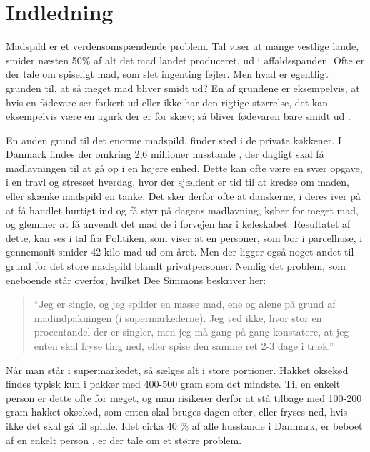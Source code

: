 \section{Indledning}
\label{sec:indledning}

Madspild er et verdensomspændende problem. Tal viser at mange vestlige lande, smider næsten 50\% af alt det mad landet produceret, ud i affaldsspanden. Ofte er der tale om spiseligt mad, som slet ingenting fejler. Men hvad er egentligt grunden til, at så meget mad bliver smidt ud? En af grundene er eksempelvis, at hvis en fødevare ser forkert ud eller ikke har den rigtige størrelse, det kan eksempelvis være en agurk der er for skæv; så bliver fødevaren bare smidt ud \cite{tedmadspild}. 

En anden grund til det enorme madspild, finder sted i de private køkkener. I Danmark findes der omkring 2,6 millioner husstande \cite{husstande}, der dagligt skal få madlavningen til at gå op i en højere enhed. Dette kan ofte være en svær opgave, i en travl og stresset hverdag, hvor der sjældent er tid til at kredse om maden, eller skænke madspild en tanke. Det sker derfor ofte at danskerne, i deres iver på at få handlet hurtigt ind og få styr på dagens madlavning, køber for meget mad, og glemmer at få anvendt det mad de i forvejen har i køleskabet. Resultatet af dette, kan ses i tal fra Politiken, som viser at en personer, som bor i parcelhuse, i gennemsnit smider 42 kilo mad ud om året. \cite{madspildpol} Men der ligger også noget andet til grund for det store madspild blandt privatpersoner. Nemlig det problem, som eneboende står overfor, hvilket Dee Simmons beskriver her: 

\begin{quote}
``Jeg er single, og jeg spilder en masse mad, ene og alene på grund af madindpakningen (i supermarkederne). Jeg ved ikke, hvor stor en procentandel der er singler, men jeg må gang på gang konstatere, at jeg enten skal fryse ting ned, eller spise den samme ret 2-3 dage i træk.'' \cite{tedcomment}
\end{quote}
 
Når man står i supermarkedet, så sælges alt i store portioner. Hakket oksekød findes typisk kun i pakker med 400-500 gram som det mindste. Til en enkelt person er dette ofte for meget, og man risikerer derfor at stå tilbage med 100-200 gram hakket oksekød, som enten skal bruges dagen efter, eller fryses ned, hvis ikke det skal gå til spilde. Idet cirka 40 \% af alle husstande i Danmark, er beboet af en enkelt person \cite{madspild16}, er der tale om et større problem. 

